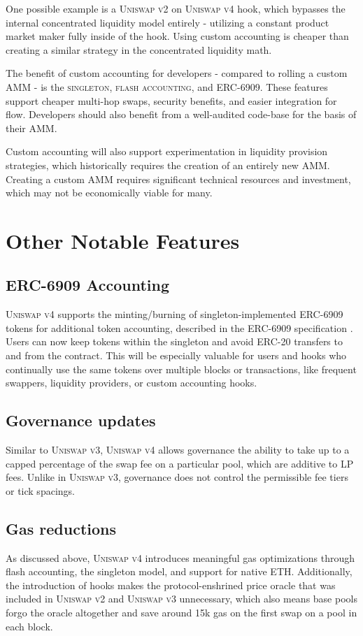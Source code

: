 \documentclass[sigconf,nonacm,prologue,table]{acmart}
\numberwithin{equation}{section}
\theoremstyle{definition}
\theoremstyle{remark}
\begin{document}
One possible example is a \textsc{Uniswap v2} on \textsc{Uniswap v4} hook, which bypasses the internal concentrated liquidity model entirely - utilizing a constant product market maker fully inside of the hook. Using custom accounting is cheaper than creating a similar strategy in the concentrated liquidity math.

The benefit of custom accounting for developers - compared to rolling a custom AMM - is the \textsc{singleton}, \textsc{flash accounting}, and \textsc{ERC-6909}. These features support cheaper multi-hop swaps, security benefits, and easier integration for flow. Developers should also benefit from a well-audited code-base for the basis of their AMM.

Custom accounting will also support experimentation in liquidity provision strategies, which historically requires the creation of an entirely new AMM. Creating a custom AMM requires significant technical resources and investment, which may not be economically viable for many. 

\section{Other Notable Features} 
\label{other}

\subsection{ERC-6909 Accounting} 
\textsc{Uniswap v4} supports the minting/burning of singleton-implemented ERC-6909 tokens for additional token accounting, described in the ERC-6909 specification \cite{riley2023}. Users can now keep tokens within the singleton and avoid ERC-20 transfers to and from the contract. This will be especially valuable for users and hooks who continually use the same tokens over multiple blocks or transactions, like frequent swappers, liquidity providers, or custom accounting hooks.


\subsection{Governance updates} \label{gov}
Similar to \textsc{Uniswap v3}, \textsc{Uniswap v4} allows governance the ability to take up to a capped percentage of the swap fee on a particular pool, which are additive to LP fees. Unlike in \textsc{Uniswap v3}, governance does not control the permissible fee tiers or tick spacings.

\subsection{Gas reductions}
As discussed above, \textsc{Uniswap v4} introduces meaningful gas optimizations through flash accounting, the singleton model, and support for native ETH. Additionally, the introduction of hooks makes the protocol-enshrined price oracle that was included in \textsc{Uniswap v2} and \textsc{Uniswap v3} unnecessary, which also means base pools forgo the oracle altogether and save around 15k gas on the first swap on a pool in each block. 
\end{document}

